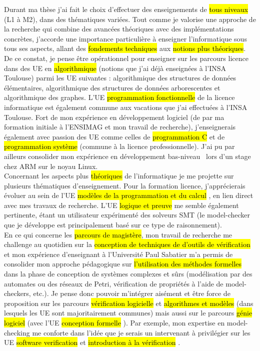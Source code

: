 \label{sec:projet_enseignement}
\vspace{10pt}

Durant ma thèse j'ai fait le choix d'effectuer des enseignements de \hl{tous
niveaux} (L1 à M2), dans des thématiques variées. Tout comme je valorise une
approche de la recherche qui combine des avancées théoriques avec des
implémentations concrètes, j'accorde une importance particulière à enseigner
l'informatique sous tous ses aspects, allant des \hl{fondements techniques} aux
\hl{notions plus théoriques}.\\

De ce constat, je pense être opérationnel pour enseigner sur les parcours
licence dans des UE en \hl{algorithmique} (notions que j'ai déjà enseignées à
l'INSA Toulouse) parmi les UE suivantes : algorithmique des structures de
données élémentaires, algorithmique des structures de données arborescentes et
algorithmique des graphes. L'UE \og \hl{programmation fonctionnelle} \fg de la
licence informatique est également commune aux vacations que j'ai
effectuées à l'INSA Toulouse. Fort de mon expérience en développement logiciel
(de par ma formation initiale à l'ENSIMAG et mon travail de recherche),
j’enseignerais également avec passion des UE comme celles de \hl{programmation
C} et de \hl{programmation système} (commune à la licence professionnelle). J'ai
pu par ailleurs consolider mon expérience en développement \og bas-niveau\ \fg
lors d'un stage chez ARM sur le noyau Linux.\\

Concernant les aspects plus \hl{théoriques} de l'informatique je me projette sur
plusieurs thématiques d'enseignement. Pour la formation licence, j’apprécierais
évoluer au sein de l'UE \og \hl{modèles de la programmation et du calcul} \fg, en lien
direct avec mes travaux de recherche. L'UE \og \hl{logique et preuve} \fg me
semble également pertinente, étant un utilisateur expérimenté des solveurs SMT
(le model-checker que je développe est principalement basé sur ce type de
raisonnement).\\

En ce qui concerne les \hl{parcours de magistère}, mon travail de recherche me
challenge au quotidien sur la \hl{conception de techniques de d'outils de
vérification} et mon expérience d'enseignant à l'Université Paul Sabatier m'a
permis de consolider mon approche pédagogique sur \hl{l'utilisation des méthodes
formelles} dans la phase de conception de systèmes complexes et
sûrs (modélisation par des automates ou des réseaux de Petri, vérification de
propriétés à l'aide de model-checkers, etc.). Je pense donc pouvoir m'intégrer
aisément et être force de proposition sur les parcours \hl{vérification
logicielle} et \hl{algorithmes et modèles} (dans lesquels les UE sont
majoritairement communes) mais aussi sur le parcours \hl{génie logiciel} (avec l'UE \og \hl{conception formelle} \fg).
Par exemple, mon expertise en model-checking me conforte dans l'idée que je
serais un intervenant à privilégier sur les UE \og \hl{software verification} \fg
et \og \hl{introduction à la vérification} \fg.\\

